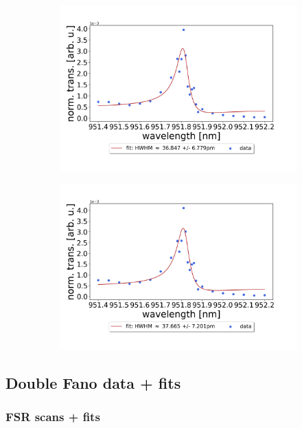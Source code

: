 \begin{figure}[h!]
\begin{subfigure}[b]{0.49\textwidth}
        \includegraphics[width=\textwidth]{figures/results/single fano fits/5um_M5_fit_3.png}
        \caption{}
        \label{fig:5um_M5_fit_3}
    \end{subfigure}
    \begin{subfigure}[b]{0.49\textwidth}
        \includegraphics[width=\textwidth]{figures/results/single fano fits/5um_M5_fit_4.png}
        \caption{}
        \label{fig:5um_M5_fit_4}
    \end{subfigure}
\end{figure}

\clearpage
\subsection{Double Fano data + fits}

\subsubsection*{FSR scans + fits}

